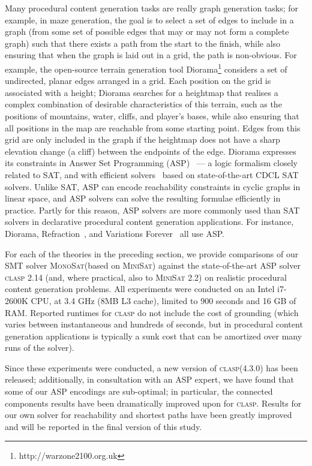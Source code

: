 \documentclass[runningheads]{llncs}
\newcommand{\algformat}[1]{\textsc{#1}\xspace}
\newcommand{\minisat}{\algformat{MiniSat}}
\newcommand{\monosat}{\algformat{MonoSat}}
\newcommand{\clasp}{\algformat{clasp}}
\begin{document}
Many procedural content generation tasks are really graph generation
tasks; for example, in maze generation, the goal is to select a set
of edges to include in a graph  (from some set of possible edges that
may or may not form a complete graph)  such that there exists a path
from the start to the finish, while also ensuring that when the graph
is laid out in a grid, the path is non-obvious.
For example, the open-source terrain
generation tool Diorama\footnote{http://warzone2100.org.uk} considers
a set of undirected, planar edges arranged in a grid. Each position on
the grid is associated with a height; Diorama searches for a heightmap
that realises a complex combination of desirable characteristics
of this terrain, such as the positions of mountains, water, cliffs, and
player's bases, while also ensuring that all positions in the map are reachable
from some starting point. Edges from this grid are only included in the
graph if the heightmap does not have a sharp elevation change (a cliff)
between the endpoints of the edge.  Diorama expresses its constraints
in Answer Set Programming (ASP)~\cite{baral2003knowledge} --- a logic
formalism closely related to SAT, and with efficient
solvers~\cite{gebser2007clasp} based on state-of-the-art
CDCL SAT solvers. Unlike SAT, ASP can encode reachability constraints in
cyclic graphs in linear space, and ASP solvers can solve the resulting
formulae efficiently in practice. Partly for this reason, ASP solvers
are more commonly used than SAT solvers in declarative procedural content
generation applications.   For instance,
Diorama, Refraction~\cite{smith2011answer},
and Variations Forever~\cite{smith2010variations} all use ASP.


For each of the theories in the preceding section, we provide comparisons of our SMT solver \monosat (based on \minisat) against the state-of-the-art ASP solver \clasp 2.14 (and, where practical, also to \minisat 2.2) on realistic procedural content generation problems. All experiments were conducted on an Intel i7-2600K CPU, at 3.4 GHz (8MB L3 cache), limited to 900 seconds and 16 GB of RAM. Reported runtimes for \clasp{} do not include the cost of grounding (which varies between instantaneous and hundreds of seconds, but in procedural content generation applications is typically a sunk cost that can be amortized over many runs of the solver).

Since these experiments were conducted, a new version of \clasp (4.3.0) has been released; additionally, in consultation with an ASP expert, we have found that some of our ASP encodings are sub-optimal; in particular, the connected components results have been dramatically improved upon for \clasp. Results for our own solver for reachability and shortest paths have been greatly improved and will be reported in the final version of this study.
\end{document}
